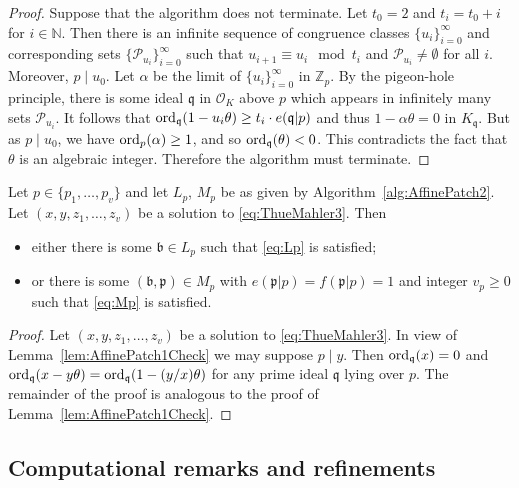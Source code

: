 \begin{proof}
Suppose that the algorithm does not terminate. Let $t_0=2$ and $t_i=t_0+i$ for $i \in \mathbb{N}$. Then there is an infinite sequence of congruence classes $\{u_i\}_{i = 0}^{\infty}$ and corresponding sets $\{\mathcal{P}_{u_i}\}_{i=0}^{\infty}$ such that $u_{i+1} \equiv u_i \mod{t_i}$ and $\mathcal{P}_{u_i} \ne \emptyset$ for all $i$. Moreover, $p \mid u_0$. Let $\alpha$ be the limit of $\{u_i\}_{i=0}^{\infty}$ in $\mathbb{Z}_p$. By the pigeon-hole principle, there is some ideal $\mathfrak{q}$ in $\mathcal{O}_K$ above $p$ which appears in infinitely many sets $\mathcal{P}_{u_i}$. It follows that $\operatorname{ord}_{\mathfrak{q}}(1 -u_i \theta) \ge t_i \cdot e(\mathfrak{q}|p)$ and thus $1-\alpha \theta=0$ in $K_{\mathfrak{q}}$. But as $p \mid u_0$, we have $\operatorname{ord}_p(\alpha) \ge 1$, and so $\operatorname{ord}_{\mathfrak{q}}(\theta)<0$. This contradicts the fact that $\theta$ is an algebraic integer. Therefore the algorithm must terminate.
\end{proof}

\begin{lemma}\label{lem:AffinePatch2Check}
Let $p \in \{p_1, \dots, p_v\}$ and let $L_p$, $M_p$ be as given by Algorithm~\ref{alg:AffinePatch2}. Let $(x,y,z_1,\dots, z_v)$ be a solution to \eqref{eq:ThueMahler3}. Then
\begin{itemize}
\item either there is some $\mathfrak{b} \in L_p$ such that \eqref{eq:Lp} is satisfied; 
\item or there is some $(\mathfrak{b},\mathfrak{p}) \in M_p$ with $e(\mathfrak{p}|p)=f(\mathfrak{p}|p)=1$ and integer $v_p \geq 0$ such that \eqref{eq:Mp} is satisfied.
\end{itemize}
\end{lemma}

\begin{proof}
Let $(x,y,z_1,\dots, z_v)$ be a solution to \eqref{eq:ThueMahler3}. In view of Lemma~\ref{lem:AffinePatch1Check} we may suppose $p \mid y$. Then $\operatorname{ord}_{\mathfrak{q}}(x) = 0$ and $\operatorname{ord}_{\mathfrak{q}}(x-y\theta)=\operatorname{ord}_{\mathfrak{q}}(1 - (y/x) \theta)$ for any prime ideal $\mathfrak{q}$ lying over $p$. The remainder of the proof is analogous to the proof of Lemma~\ref{lem:AffinePatch1Check}.
\end{proof}


\subsection{Computational remarks and refinements}
\label{subsec:PIRLRemarks}

